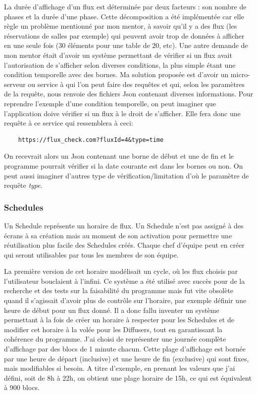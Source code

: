 \documentclass[french]{article}
\begin{document}
La durée d'affichage d'un flux est déterminée par deux facteurs : son nombre de phases et la durée d'une phase. Cette décomposition a été implémentée car elle règle un problème mentionné par mon mentor, à savoir qu'il y a des flux (les réservations de salles par exemple) qui peuvent avoir trop de données à afficher en une seule fois (30 éléments pour une table de 20, etc). \newline
Une autre demande de mon mentor était d'avoir un système permettant de vérifier si un flux avait l'autorisation de s'afficher selon diverses conditions, la plus simple étant une condition temporelle avec des bornes. Ma solution proposée est d'avoir un micro-serveur ou service à qui l'on peut faire des requêtes et qui, selon les paramètres de la requête, nous renvoie des fichiers Json contenant diverses informations. Pour reprendre l'exemple d'une condition temporelle, on peut imaginer que l'application doive vérifier si un flux à le droit de s'afficher. Elle fera donc une requête à ce service qui ressemblera à ceci: 
\begin{verbatim}
	https://flux_check.com?fluxId=4&type=time
\end{verbatim}
On recevrait alors un Json contenant une borne de début et une de fin et le programme pourrait vérifier si la date courante est dans les bornes ou non. On peut aussi imaginer d'autres type de vérification/limitation d'où le paramètre de requête \textit{type}.

\subsubsection{Schedules}
Un Schedule représente un horaire de flux. Un Schedule n'est pas assigné à des écrans à sa création mais au moment de son activation pour permettre  une réutilisation plus facile des Schedules créés. Chaque chef d'équipe peut en créer qui seront utilisables par tous les membres de son équipe. \newline

La première version de cet horaire modélisait un cycle, où les flux choisis par l'utilisateur bouclaient à l'infini. Ce système a été utilisé avec succès pour de la recherche et des tests sur la faisabilité du programme mais fut vite obsolète quand il s'agissait d'avoir plus de contrôle sur l'horaire, par exemple définir une heure de début pour un flux donné. \newline
Il a donc fallu inventer un système permettant à la fois de créer un horaire à respecter pour les Schedules et de modifier cet horaire à la volée pour les Diffusers, tout en garantissant la cohérence du programme. 
	\newline
J'ai choisi de représenter une journée complète d'affichage par des blocs de 1 minute chacun. Cette plage d'affichage est bornée par une heure de départ (inclusive) et une heure de fin (exclusive) qui sont fixes, mais modifiables si besoin. A titre d'exemple, en prenant les valeurs que j'ai défini, soit de 8h à 22h, on obtient une plage horaire de 15h, ce qui est équivalent à 900 blocs. \newline
\end{document}
